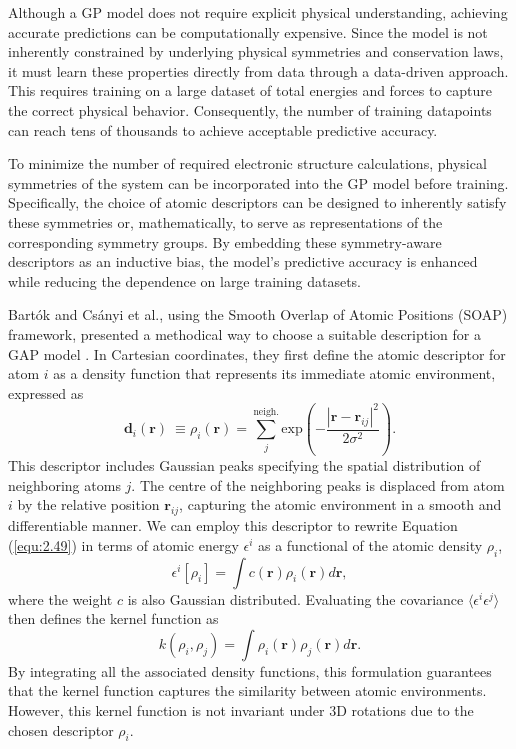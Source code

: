 Although a GP model does not require explicit physical understanding, achieving accurate predictions can be computationally expensive.
Since the model is not inherently constrained by underlying physical symmetries and conservation laws, it must learn these properties directly from data through a data-driven approach.
This requires training on a large dataset of total energies and forces to capture the correct physical behavior.
Consequently, the number of training datapoints can reach tens of thousands to achieve acceptable predictive accuracy.

To minimize the number of required electronic structure calculations, physical symmetries of the system can be incorporated into the GP model before training.
Specifically, the choice of atomic descriptors can be designed to inherently satisfy these symmetries or, mathematically, to serve as representations of the corresponding symmetry groups.
By embedding these symmetry-aware descriptors as an inductive bias, the model's predictive accuracy is enhanced while reducing the dependence on large training datasets.

Bart\'{o}k and Cs\'{a}nyi et al., using the Smooth Overlap of Atomic Positions (SOAP) framework, presented a methodical way to choose a suitable description for a GAP model \cite{Bartk2013, Bartk2015}.
In Cartesian coordinates, they first define the atomic descriptor for atom $i$ as a density function that represents its immediate atomic environment, expressed as 
\begin{equation}
    \label{equ:2.52}
      \textbf{d}_{i}(\textbf{r})~\equiv \rho_{i}(\textbf{r}) = \sum^{\text{neigh.}}_{j} \text{exp}\left(-\frac{|\textbf{r}-\textbf{r}_{ij}|^{2}}{2\sigma^{2}}\right).
\end{equation}
This descriptor includes Gaussian peaks specifying the spatial distribution of neighboring atoms $j$.
The centre of the neighboring peaks is displaced from atom $i$ by the relative position $\textbf{r}_{ij}$, capturing the atomic environment in a smooth and differentiable manner.
We can employ this descriptor to rewrite Equation (\ref{equ:2.49}) in terms of atomic energy $\epsilon^{i}$ as a functional of the atomic density $\rho_{i}$,
\begin{equation}
    \label{equ:2.53}
      \epsilon^{i}[\rho_{i}] = \int c(\textbf{r})\rho_{i}(\textbf{r})d\textbf{r},
\end{equation}
where the weight $c$ is also Gaussian distributed.
Evaluating the covariance $\langle\epsilon^{i}\epsilon^{j}\rangle$ then defines the kernel function as 
\begin{equation}
    \label{equ:2.54}
      k(\rho_{i}, \rho_{j}) = \int \rho_{i}(\textbf{r})\rho_{j}(\textbf{r})d\textbf{r}.
\end{equation}
By integrating all the associated density functions, this formulation guarantees that the kernel function captures the similarity between atomic environments. However, this kernel function is not invariant under 3D rotations due to the chosen descriptor $\rho_{i}$. 

